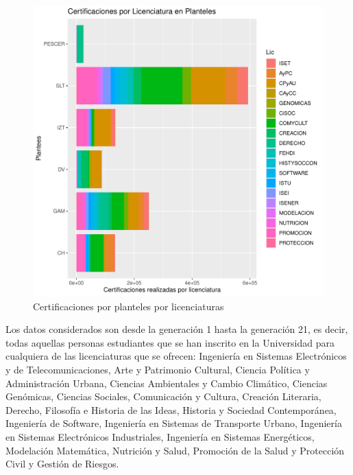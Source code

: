 \documentclass[12pt]{article}
\begin{document}
\begin{figure}
\centering
\includegraphics[scale=0.45]{Graficas/ggplotBarplotPlantelLic.pdf}
\caption{Certificaciones por planteles por licenciaturas}
\label{Fig.Cert.Plantel-Lic}
\end{figure}




Los datos considerados son desde la generaci\'on 1 hasta la generaci\'on 21, es decir, todas aquellas personas estudiantes que se han inscrito en la Universidad para cualquiera de las licenciaturas que se ofrecen: Ingenier\'ia en Sistemas Electr\'onicos y de Telecomunicaciones, Arte y Patrimonio Cultural, Ciencia Pol\'itica y Administraci\'on Urbana, Ciencias Ambientales y Cambio Clim\'atico, Ciencias Gen\'omicas, Ciencias Sociales, Comunicaci\'on y Cultura, Creaci\'on Literaria, Derecho, Filosof\'ia e Historia de las Ideas, Historia y Sociedad Contempor\'anea, Ingenier\'ia de Software, Ingenier\'ia en Sistemas de Transporte Urbano, Ingenier\'ia en Sistemas Electr\'onicos Industriales, Ingenier\'ia en Sistemas Energ\'eticos, Modelaci\'on Matem\'atica, Nutrici\'on y Salud, Promoci\'on de la Salud y  Protecci\'on Civil y Gesti\'on de Riesgos.
\end{document}
